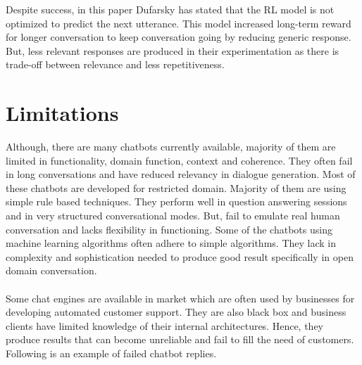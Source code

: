 \documentclass[a4paper,12pt]{report}
\begin{document}
\noindent Despite success, in this paper Dufarsky has stated that the RL model is not optimized to predict the next utterance. This model increased long-term reward for longer conversation to keep conversation going by reducing generic response. But, less relevant responses are produced in their experimentation as there is trade-off between relevance and less repetitiveness.
\newpage
{\let\clearpage\relax \chapter {Limitations}}
\noindent Although, there are many chatbots currently available, majority of them are limited in functionality, domain function, context and coherence. They often fail in long conversations and have reduced relevancy in dialogue generation. Most of these chatbots are developed for restricted domain. Majority of them are using simple rule based techniques. They perform well in question answering sessions and in very structured conversational modes. But, fail to emulate real human conversation and lacks flexibility in functioning. Some of the chatbots using machine learning algorithms often adhere to simple algorithms. They lack in complexity and sophistication needed to produce good result specifically in open domain conversation.\\\\
Some chat engines are available in market which are often used by businesses for developing automated customer support. They are also black box and business clients have limited knowledge of their internal architectures. Hence, they produce results that can become unreliable and fail to fill the need of customers.
Following is an example of failed chatbot replies.
\end{document}
